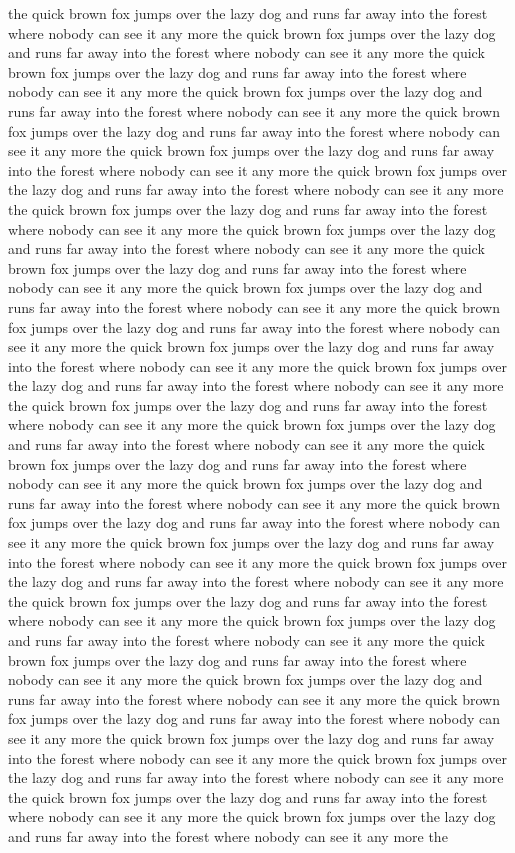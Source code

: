 \documentclass{article}
\begin{document}
the quick brown fox jumps over the lazy dog and runs far away into the forest where nobody can see it any more the quick brown fox jumps over the lazy dog and runs far away into the forest where nobody can see it any more the quick brown fox jumps over the lazy dog and runs far away into the forest where nobody can see it any more the quick brown fox jumps over the lazy dog and runs far away into the forest where nobody can see it any more the quick brown fox jumps over the lazy dog and runs far away into the forest where nobody can see it any more the quick brown fox jumps over the lazy dog and runs far away into the forest where nobody can see it any more the quick brown fox jumps over the lazy dog and runs far away into the forest where nobody can see it any more the quick brown fox jumps over the lazy dog and runs far away into the forest where nobody can see it any more the quick brown fox jumps over the lazy dog and runs far away into the forest where nobody can see it any more the quick brown fox jumps over the lazy dog and runs far away into the forest where nobody can see it any more the quick brown fox jumps over the lazy dog and runs far away into the forest where nobody can see it any more the quick brown fox jumps over the lazy dog and runs far away into the forest where nobody can see it any more the quick brown fox jumps over the lazy dog and runs far away into the forest where nobody can see it any more the quick brown fox jumps over the lazy dog and runs far away into the forest where nobody can see it any more the quick brown fox jumps over the lazy dog and runs far away into the forest where nobody can see it any more the quick brown fox jumps over the lazy dog and runs far away into the forest where nobody can see it any more the quick brown fox jumps over the lazy dog and runs far away into the forest where nobody can see it any more the quick brown fox jumps over the lazy dog and runs far away into the forest where nobody can see it any more the quick brown fox jumps over the lazy dog and runs far away into the forest where nobody can see it any more the quick brown fox jumps over the lazy dog and runs far away into the forest where nobody can see it any more the quick brown fox jumps over the lazy dog and runs far away into the forest where nobody can see it any more the quick brown fox jumps over the lazy dog and runs far away into the forest where nobody can see it any more the quick brown fox jumps over the lazy dog and runs far away into the forest where nobody can see it any more the quick brown fox jumps over the lazy dog and runs far away into the forest where nobody can see it any more the quick brown fox jumps over the lazy dog and runs far away into the forest where nobody can see it any more the quick brown fox jumps over the lazy dog and runs far away into the forest where nobody can see it any more the quick brown fox jumps over the lazy dog and runs far away into the forest where nobody can see it any more the quick brown fox jumps over the lazy dog and runs far away into the forest where nobody can see it any more the quick brown fox jumps over the lazy dog and runs far away into the forest where nobody can see it any more the quick brown fox jumps over the lazy dog and runs far away into the forest where nobody can see it any more the 
\end{document}
